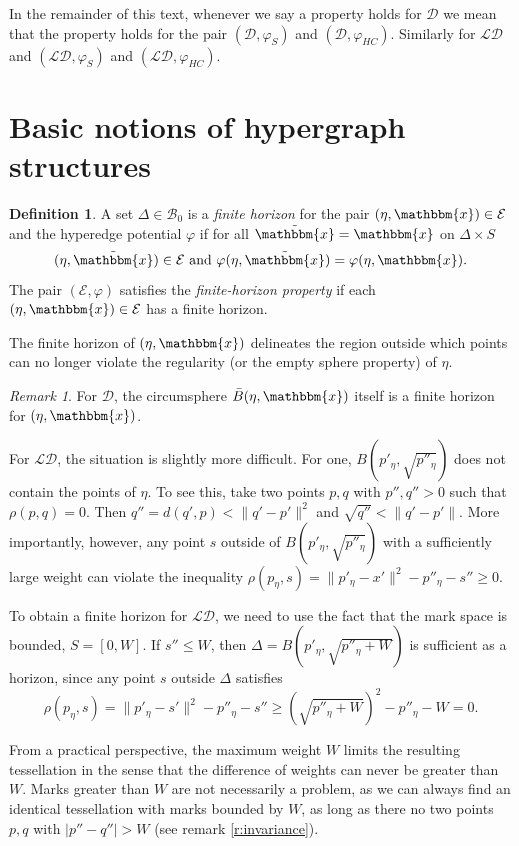 \documentclass[12pt,a4paper]{article}
\theoremstyle{definition}
\newtheorem{definition}{Definition}
\theoremstyle{remark}
\newtheorem{remark}{Remark}
\theoremstyle{theorem}
\newcommand{\x}{\mathbbm{x}}
\begin{document}
In the remainder of this text, whenever we say a property holds for $\mathcal D$ we mean that the property holds for the pair $(\mathcal D,\varphi_S)$ and $(\mathcal D,\varphi_{HC})$. Similarly for $\mathcal {LD}$ and $(\mathcal {LD},\varphi_S)$ and $(\mathcal {LD}, \varphi_{HC})$.




\section{Basic notions of hypergraph structures}

\begin{definition}
A set $\Delta \in \mathcal B_0$ is a \textit{finite horizon} for the pair $(\eta,\x) \in \mathcal E$ and the hyperedge potential $\varphi$ if for all $\tilde{\x} = \x$ on $\Delta\times S$ 
$$(\eta,\tilde{\x})\in\mathcal E \text{ and } \varphi(\eta,\tilde{\x}) = \varphi(\eta,\x). $$
The pair $(\mathcal E, \varphi)$ satisfies the \textit{finite-horizon property} if each $(\eta,\x)\in \mathcal E$ has a finite horizon.
\end{definition}

The finite horizon of $(\eta,\x)$ delineates the region outside which points can no longer violate the regularity (or the empty sphere property) of $\eta$. 

\begin{remark}
For $\mathcal D$, the circumsphere $\bar B(\eta,\x)$ itself is a finite horizon for $(\eta,\x)$.

For $\mathcal {LD}$, the situation is slightly more difficult. For one, $B(p'_\eta, \sqrt{p''_\eta})$ does not contain the points of $\eta$. To see this, take two points $p,q$ with $p'',q''>0$ such that $\rho(p,q)=0$. Then $q'' = d(q',p) < \|q'-p'\|^2$ and $\sqrt{q''} < \|q'-p'\|$. More importantly, however, any point $s$ outside of $B(p'_\eta, \sqrt{p''_\eta})$ with a sufficiently large weight can violate the inequality $\rho(p_\eta,s) = \|p'_\eta - x'\|^2 - p''_\eta - s'' \geq 0$. 

To obtain a finite horizon for $\mathcal {LD}$, we need to use the fact that the mark space is bounded, $S=[0,W]$. If $s'' \leq W$, then $\Delta = B(p'_\eta, \sqrt{p''_\eta + W})$ is sufficient as a horizon, since any point $s$ outside $\Delta$ satisfies
$$\rho(p_\eta, s) = \|p'_\eta - s'\|^2 - p''_\eta - s'' \geq (\sqrt{p''_\eta+W})^2-p''_\eta-W = 0.$$ 

From a practical perspective, the maximum weight $W$ limits the resulting tessellation in the sense that the difference of weights can never be greater than $W$. Marks greater than $W$ are not necessarily a problem, as we can always find an identical tessellation with marks bounded by $W$, as long as there no two points $p,q$ with $|p''-q''|>W$ (see remark \ref{r:invariance}).
\end{remark} 
\end{document}
